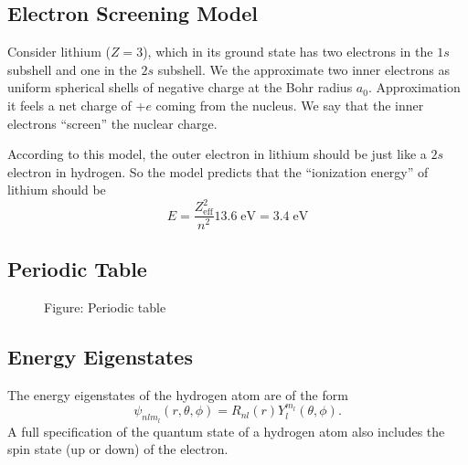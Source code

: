 \documentclass[../../main.tex]{subfiles}
\begin{document}
\subsection{Electron Screening Model}
Consider lithium ($Z = 3$), which in its ground state has two electrons in the $1s$ subshell and one in the $2s$ subshell. We the approximate two inner electrons as uniform spherical shells of negative
charge at the Bohr radius $a_0$. Approximation it feels a net charge of +$e$ coming from the nucleus. We say that the inner electrons “screen” the nuclear charge. 

According to this model, the outer electron in lithium should be just like a $2s$ electron in hydrogen. So the model predicts that the “ionization energy” of lithium should be 
\begin{equation*}
    E=\frac{Z_{\text{eff}}^2}{n^2}13.6\;\text{eV}=3.4 \;\text{eV}
\end{equation*}

\subsection{Periodic Table}
\clearpage
\begin{figure}[h]
        \centering
        \caption*{Figure: Periodic table}
\end{figure}
\clearpage

\subsection{Energy Eigenstates}
The energy eigenstates of the hydrogen atom are of the form
\begin{equation*}
    \psi_{nlm_l} (r,\theta,\phi) = R_{nl}(r)Y^{m_l}_l (\theta,\phi).
\end{equation*}
A full specification of the quantum state of a hydrogen atom also includes the spin state (up or down) of the electron.
\end{document}
